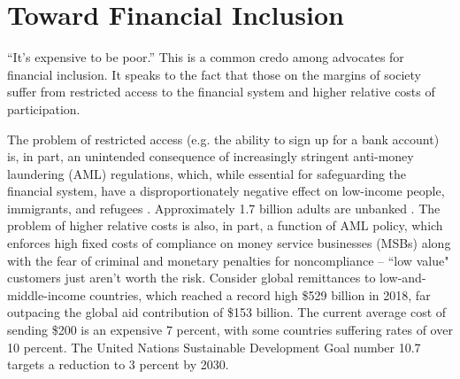 \documentclass[sigconf,submission]{acmart}
\begin{document}

%


\maketitle

\section{Toward Financial Inclusion}
``It's expensive to be poor.'' This is a common credo among advocates for financial inclusion. It speaks to the fact that those on the margins of society suffer from restricted access to the financial system and higher relative costs of participation. 

The problem of restricted access (e.g. the ability to sign up for a bank account) is, in part, an unintended consequence of increasingly stringent anti-money laundering (AML) regulations, which, while essential for safeguarding the financial system, have a disproportionately negative effect on low-income people, immigrants, and refugees \citep{WorldBank2012}. Approximately 1.7 billion adults are unbanked \citep{WorldBank2017}. The problem of higher relative costs is also, in part, a function of AML policy, which enforces high fixed costs of compliance on money service businesses (MSBs) along with the fear of criminal and monetary penalties for noncompliance -- ``low value" customers just aren't worth the risk. Consider global remittances to low-and-middle-income countries, which reached a record high \$529 billion in 2018, far outpacing the global aid contribution of \$153 billion. The current average cost of sending \$200 is an expensive 7 percent, with some countries suffering rates of over 10 percent. The United Nations Sustainable Development Goal number 10.7 targets a reduction to 3 percent by 2030.\citep{WorldBank2019}
\end{document}
